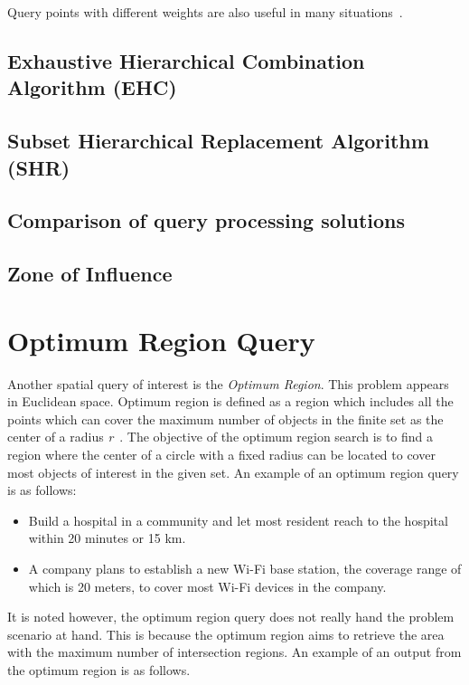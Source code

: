 \documentclass[a4paper,11pt]{article}
\begin{document}
Query points with different weights are also useful in many situations~\cite{deng2012group}.

\subsection{Exhaustive Hierarchical Combination Algorithm (EHC)}

\subsection{Subset Hierarchical Replacement Algorithm (SHR)}

\subsection{Comparison of query processing solutions}

\subsection{Zone of Influence}
 

\section{Optimum Region Query} 

Another spatial query of interest is the \textit{Optimum Region}. This problem appears in Euclidean space. Optimum region is defined as a region which includes all the points which can cover the maximum number of objects in the finite set as the center of a radius \textit{r}~\cite{Xuan2012}. The objective of the optimum region search is to find a region where the center of a circle with a fixed radius can be located to cover most objects of interest in the given set. An example of an optimum region query is as follows:

\begin{itemize}      
  \item Build a hospital in a community and let most
resident reach to the hospital within 20 minutes or 15 km.      
  \item A company plans to establish a new Wi-Fi base station, the coverage range of
which is 20 meters, to cover most Wi-Fi   devices in the company.
\end{itemize}

It is noted however, the optimum region query does not really hand the problem scenario at hand. This is because the optimum region aims to retrieve the area with the maximum number of intersection regions. An example of an output from the optimum region is as follows.
\end{document}

